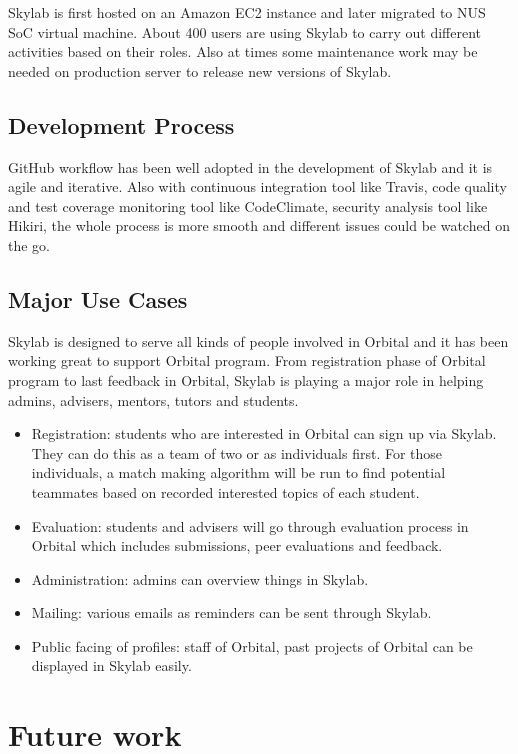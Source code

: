 Skylab is first hosted on an Amazon EC2 instance and later migrated to NUS SoC virtual machine. About 400 users are using Skylab to carry out different activities based on their roles. Also at times some maintenance work may be needed on production server to release new versions of Skylab.

\subsection{Development Process}

GitHub workflow has been well adopted in the development of Skylab and it is agile and iterative. Also with continuous integration tool like Travis, code quality and test coverage monitoring tool like CodeClimate, security analysis tool like Hikiri, the whole process is more smooth and different issues could be watched on the go.

\subsection{Major Use Cases}

Skylab is designed to serve all kinds of people involved in Orbital and it has been working great to support Orbital program. From registration phase of Orbital program to last feedback in Orbital, Skylab is playing a major role in helping admins, advisers, mentors, tutors and students.

\begin{itemize}
  \item Registration: students who are interested in Orbital can sign up via Skylab. They can do this as a team of two or as individuals first. For those individuals, a match making algorithm will be run to find potential teammates based on recorded interested topics of each student.
  \item Evaluation: students and advisers will go through evaluation process in Orbital which includes submissions, peer evaluations and feedback.
  \item Administration: admins can overview things in Skylab.
  \item Mailing: various emails as reminders can be sent through Skylab.
  \item Public facing of profiles: staff of Orbital, past projects of Orbital can be displayed in Skylab easily.
\end{itemize}

\section{Future work}

